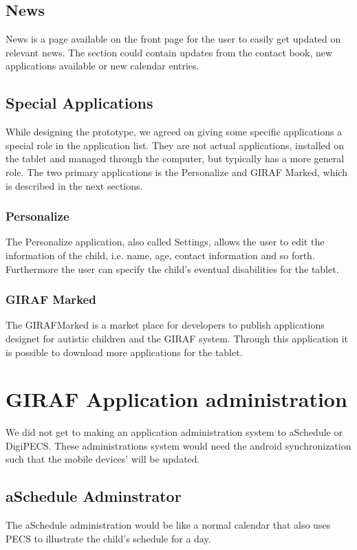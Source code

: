 \subsection{News}
News is a page available on the front page for the user to easily get updated on relevant news. The section could contain updates from the contact book, new applications available or new calendar entries.   

\subsection{Special Applications}
While designing the prototype, we agreed on giving some specific applications a special role in the application list. They are not actual applications, installed on the tablet and managed through the computer, but typically has a more general role. The two primary applications is the Personalize and GIRAF Marked, which is described in the next sections. 

\subsubsection*{Personalize}
The Personalize application, also called Settings, allows the user to edit the information of the child, i.e. name, age, contact information and so forth. Furthermore the user can specify the child's eventual disabilities for the tablet.

\subsubsection*{GIRAF Marked}
The GIRAFMarked is a market place for developers to publish applications designet for autistic children and the GIRAF system. Through this application it is possible to download more applications for the tablet. 







\section{GIRAF Application administration}
We did not get to making an application administration system to aSchedule or DigiPECS. These administrations system would need the android synchronization such that the mobile devices' will be updated. 

\subsection{aSchedule Adminstrator}
The aSchedule administration would be like a normal calendar that also uses PECS to illustrate the child's schedule for a day. 

